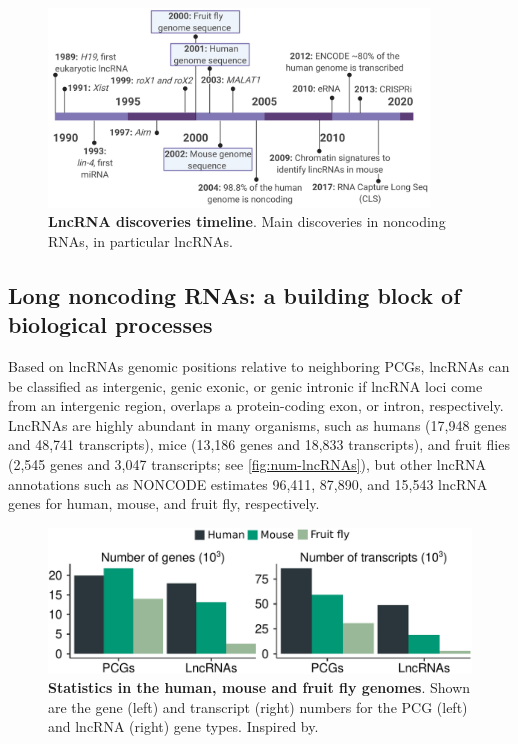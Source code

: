 \begin{figure}[!htb]
  \centering
  \includegraphics[width=0.9\textwidth]{img/introduction/lncRNA_timeline.png}
  \caption[LncRNA discoveries timeline]{\textbf{LncRNA discoveries timeline}. Main discoveries in noncoding RNAs, in particular lncRNAs.}
  \label{fig:lncRNA-time-line}
\end{figure}

\clearpage

\subsection{Long noncoding RNAs: a building block of biological processes}
\label{subsec:lncRNA_building_block}

Based on lncRNAs genomic positions relative to neighboring PCGs, lncRNAs can be classified as intergenic, genic exonic, or genic intronic if lncRNA loci come from an intergenic region, overlaps a protein-coding exon, or intron,\autocite{wucher_2017} respectively. LncRNAs are highly abundant in many organisms,\autocite{frankish_2021_gencode,thurmond_2019_flybase} such as humans (17,948 genes and 48,741 transcripts), mice (13,186 genes and 18,833 transcripts), and fruit flies (2,545 genes and 3,047 transcripts; see \autoref{fig:num-lncRNAs}), but other lncRNA annotations such as NONCODE\autocite{zhao_2021_noncodev6} estimates 96,411, 87,890, and 15,543 lncRNA genes for human, mouse, and fruit fly, respectively. 

\begin{figure}[!htb]
  \centering
  \includegraphics[scale=0.57]{plots/introduction/num.genes.transcripts.pdf}
  \caption[Statistics in the human, mouse and fruit fly genomes]{\textbf{Statistics in the human, mouse and fruit fly genomes}. Shown are the gene (left) and transcript (right) numbers for the PCG (left) and lncRNA (right) gene types. Inspired by.\autocite{derrien_2012_gencode}}
  \label{fig:num-lncRNAs}
\end{figure}

